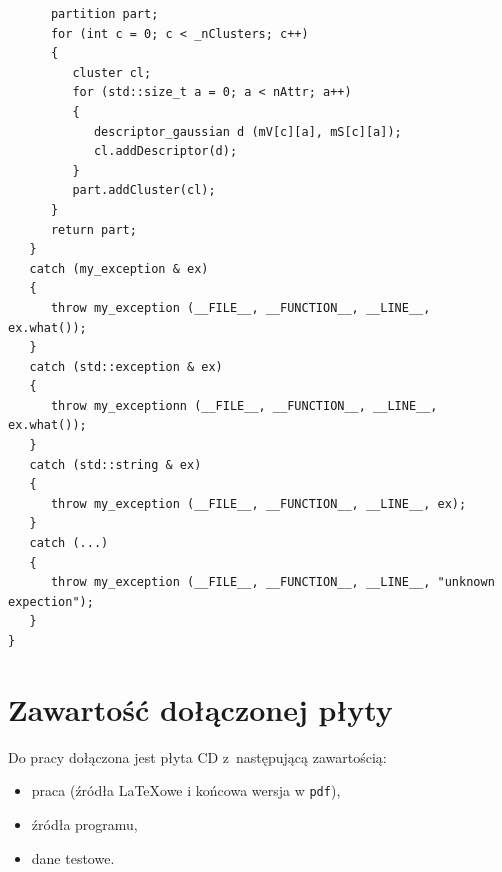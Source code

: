 \documentclass[a4paper,twoside,12pt]{book}
\begin{document}
\begin{appendices}
\begin{lstlisting}
      partition part;
      for (int c = 0; c < _nClusters; c++)
      {
         cluster cl; 
         for (std::size_t a = 0; a < nAttr; a++)
         {
            descriptor_gaussian d (mV[c][a], mS[c][a]);
            cl.addDescriptor(d);
         }
         part.addCluster(cl);
      }
      return part;
   }
   catch (my_exception & ex)                                  
   {                                                       
      throw my_exception (__FILE__, __FUNCTION__, __LINE__, ex.what()); 
   }                                                          
   catch (std::exception & ex)                                 
   {                                                            
      throw my_exceptionn (__FILE__, __FUNCTION__, __LINE__, ex.what()); 
   }                                                            
   catch (std::string & ex)                                     
   {                                                            
      throw my_exception (__FILE__, __FUNCTION__, __LINE__, ex);        
   }                                                             
   catch (...)                                                   
   {                                                             
      throw my_exception (__FILE__, __FUNCTION__, __LINE__, "unknown expection");       
   }  
}
\end{lstlisting}
 

\chapter*{Zawartość dołączonej płyty}

Do pracy dołączona jest płyta CD z~następującą zawartością:
\begin{itemize}
\item praca (źródła \LaTeX owe i końcowa wersja w \texttt{pdf}),
\item źródła programu,
\item dane testowe.
\end{itemize}

\listoffigures
\listoftables
	
\end{appendices}
\end{document}
